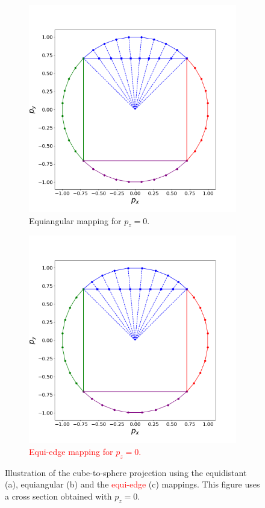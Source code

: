 \documentclass[preprint,12pt]{elsarticle}
\begin{document}
\begin{linenumbers}
\begin{figure}[!htb]
	\begin{subfigure}{0.45\textwidth}
		\centering
		\includegraphics[width=1.1\linewidth]{g2}
		\caption{Equiangular mapping for $p_z=0$.\label{sph-cube-equiangular}}
	\end{subfigure}
	\begin{subfigure}{0.45\textwidth}
	\centering
	\includegraphics[width=1.1\linewidth]{g0}
	\caption{\textcolor{red}{Equi-edge mapping for $p_z=0$.}\label{sph-cube-equiedge}}
\end{subfigure}
\caption{Illustration of the cube-to-sphere projection using the equidistant (a),  equiangular (b) and the \textcolor{red}{equi-edge}  (c) mappings. This figure uses a cross section obtained with $p_z=0$.}
\label{sph-cube-mappings}
\end{figure}


\end{linenumbers}
\end{document}
